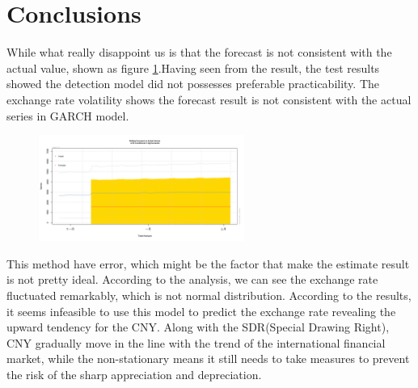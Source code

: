 \documentclass[12pt, a4paper, titlepage]{article}
\begin{document}
\section{Conclusions}
While what really disappoint us is that the forecast is not consistent with the actual value, shown as figure \ref{volatility}.Having seen from the result, the test results showed the detection model did not possesses preferable practicability. The exchange rate volatility shows the forecast result is not consistent with the actual series in GARCH model.\\
\begin{figure}[h!]
\begin{center}
\caption{}\label{volatility}
\includegraphics[width=0.6\textwidth]{forecast.jpg}
\end{center}
\end{figure}

This method have error, which might be the factor that make the estimate result is not pretty ideal. According to the analysis, we can see the exchange rate fluctuated remarkably, which is not normal distribution. According to the results, it seems infeasible to use this model to predict the exchange rate revealing the upward tendency for the CNY. Along with the SDR(Special Drawing Right), CNY gradually move in the line with the trend of the international financial market, while the non-stationary means it still needs to take measures to prevent the risk of the sharp appreciation and depreciation.\\
\end{document}
